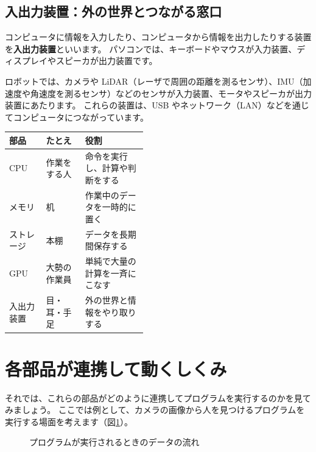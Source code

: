 \subsection{入出力装置：外の世界とつながる窓口}

コンピュータに情報を入力したり、コンピュータから情報を出力したりする装置を\textbf{入出力装置}といいます。
パソコンでは、キーボードやマウスが入力装置、ディスプレイやスピーカが出力装置です。

ロボットでは、カメラや LiDAR（レーザで周囲の距離を測るセンサ）、IMU（加速度や角速度を測るセンサ）などのセンサが入力装置、モータやスピーカが出力装置にあたります。
これらの装置は、USB やネットワーク（LAN）などを通じてコンピュータにつながっています。

\begin{tablebox}
  \begin{tabular}{llp{0.45\linewidth}}
    \toprule
    部品 & たとえ & 役割 \\
    \midrule
    CPU & 作業をする人 & 命令を実行し、計算や判断をする \\
    メモリ & 机 & 作業中のデータを一時的に置く \\
    ストレージ & 本棚 & データを長期間保存する \\
    GPU & 大勢の作業員 & 単純で大量の計算を一斉にこなす \\
    入出力装置 & 目・耳・手足 & 外の世界と情報をやり取りする \\
    \bottomrule
  \end{tabular}
\end{tablebox}

\section{各部品が連携して動くしくみ}
\label{sec:computer-flow}

それでは、これらの部品がどのように連携してプログラムを実行するのかを見てみましょう。
ここでは例として、カメラの画像から人を見つけるプログラムを実行する場面を考えます（図\ref{fig:computer-flow}）。

\begin{figure}[tb]
  \centering
  
  \caption{プログラムが実行されるときのデータの流れ}
  \label{fig:computer-flow}
\end{figure}

